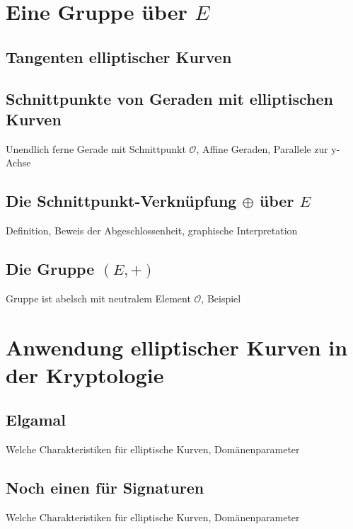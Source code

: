 \documentclass[hidelinks]{article}
\begin{document}
\section{Eine Gruppe über $E$}
\subsection{Tangenten elliptischer Kurven}
\subsection{Schnittpunkte von Geraden mit elliptischen Kurven}
Unendlich ferne Gerade mit Schnittpunkt $\mathcal{O}$, Affine Geraden, Parallele zur y-Achse
\subsection{Die Schnittpunkt-Verknüpfung $\oplus $ über $E$}
Definition, Beweis der Abgeschlossenheit, graphische Interpretation
\subsection{Die Gruppe $(E, +)$}
Gruppe ist abelsch mit neutralem Element $\mathcal{O}$, Beispiel
\section{Anwendung elliptischer Kurven in der Kryptologie}
\subsection{Elgamal}
Welche Charakteristiken für elliptische Kurven, Domänenparameter
\subsection{Noch einen für Signaturen}
Welche Charakteristiken für elliptische Kurven, Domänenparameter

\nocite{*}


\end{document}
